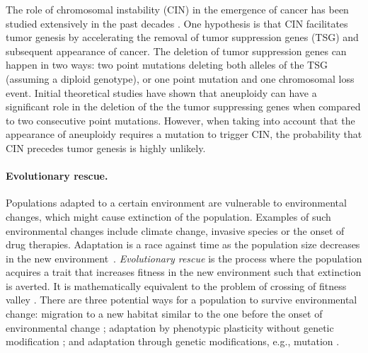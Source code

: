 \documentclass[12pt]{extarticle}
\begin{document}

The role of chromosomal instability (CIN) in the emergence of cancer has been studied extensively in the past decades \cite{michor2005can,christine2018understanding,nowak2002role,pavelka2010dr,komarova2003mutation,zhu2018cellular}.
One hypothesis is that CIN facilitates tumor genesis by accelerating the removal of tumor suppression genes (TSG) and subsequent appearance of cancer. The deletion of tumor suppression genes can happen in two ways: two point mutations deleting both alleles of the TSG (assuming a diploid genotype), or one point mutation and one chromosomal loss event.
Initial theoretical studies have shown that aneuploidy can have a significant role in the deletion of the the tumor suppressing genes when compared to two consecutive point mutations\cite{nowak2002role,komarova2003mutation,michor2005can,komarova2008selective}. %
However, when taking into account that the appearance of aneuploidy requires a mutation to trigger CIN, the probability that CIN precedes tumor genesis is highly unlikely.

\paragraph{Evolutionary rescue.} Populations adapted to a certain environment are vulnerable to environmental changes, which might cause extinction of the population. Examples of such environmental changes include climate change, invasive species or the onset of drug therapies. Adaptation is a race against time as the population size decreases in the new environment~\cite{tanaka2022surviving}. 
{\em Evolutionary rescue} is the process where the population acquires a trait that increases fitness in the new environment such that extinction is averted. It is mathematically equivalent to the problem of crossing of fitness valley \cite{weissman2009rate,weissman2010rate}.
There are three potential ways for a population to survive environmental change: migration to a new habitat similar to the one before the onset of environmental change \cite{cobbold2020should}; adaptation by phenotypic plasticity without genetic modification \cite{carja2019evolutionary,carja2017evolutionary,levien2021non}; and adaptation through genetic modifications, e.g., mutation \cite{uecker2014evolutionary,uecker2016role,uecker2011fixation}.
\end{document}
